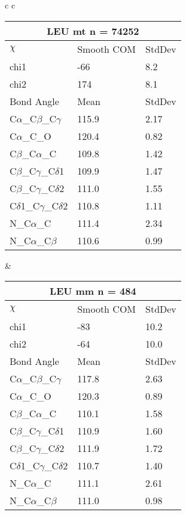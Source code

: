 \begin{longtable}{ c c }
\begin{tabular}{ l l l }
  \multicolumn{3}{c}{LEU \textbf{mt} n = 74252} \\ \toprule
  $\chi$       & Smooth COM & StdDev \\ \midrule
  chi1 & -66 & 8.2 \\ 
  chi2 & 174 & 8.1 \\ \midrule
  Bond Angle   & Mean     & StdDev \\ \midrule
  C$\alpha$\_C$\beta$\_C$\gamma$ & 115.9 & 2.17\\
  C$\alpha$\_C\_O & 120.4 & 0.82\\
  C$\beta$\_C$\alpha$\_C & 109.8 & 1.42\\
  C$\beta$\_C$\gamma$\_C$\delta$1 & 109.9 & 1.47\\
  C$\beta$\_C$\gamma$\_C$\delta$2 & 111.0 & 1.55\\
  C$\delta$1\_C$\gamma$\_C$\delta$2 & 110.8 & 1.11\\
  N\_C$\alpha$\_C & 111.4 & 2.34\\
  N\_C$\alpha$\_C$\beta$ & 110.6 & 0.99\\
  \bottomrule
  \end{tabular}
  &
  \begin{tabular}{ l l l }
  \toprule
  \multicolumn{3}{c}{LEU \textbf{mm} n = 484} \\ \toprule
  $\chi$       & Smooth COM & StdDev \\ \midrule
  chi1 & -83 & 10.2 \\ 
  chi2 & -64 & 10.0 \\ \midrule
  Bond Angle   & Mean     & StdDev \\ \midrule
  C$\alpha$\_C$\beta$\_C$\gamma$ & 117.8 & 2.63\\
  C$\alpha$\_C\_O & 120.3 & 0.89\\
  C$\beta$\_C$\alpha$\_C & 110.1 & 1.58\\
  C$\beta$\_C$\gamma$\_C$\delta$1 & 110.9 & 1.60\\
  C$\beta$\_C$\gamma$\_C$\delta$2 & 111.9 & 1.72\\
  C$\delta$1\_C$\gamma$\_C$\delta$2 & 110.7 & 1.40\\
  N\_C$\alpha$\_C & 111.1 & 2.61\\
  N\_C$\alpha$\_C$\beta$ & 111.0 & 0.98\\
  \bottomrule
  \end{tabular}
  \\
  
\end{longtable}

\newpage

